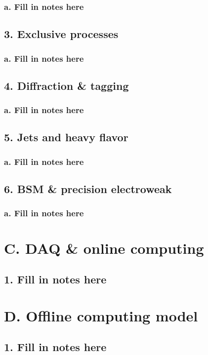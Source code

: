 \documentclass{report}
\begin{document}
\subsubsection{a. Fill in notes here}
\subsection{3. Exclusive processes} 
\subsubsection{a. Fill in notes here}
\subsection{4. Diffraction \& tagging}
\subsubsection{a. Fill in notes here}
\subsection{5. Jets and heavy flavor}
\subsubsection{a. Fill in notes here}
\subsection{6. BSM \& precision electroweak}
\subsubsection{a. Fill in notes here}
%
\section{C. DAQ \& online computing}
\subsection{1. Fill in notes here}
%
\section{D. Offline computing model}
\subsection{1. Fill in notes here}
\end{document}
